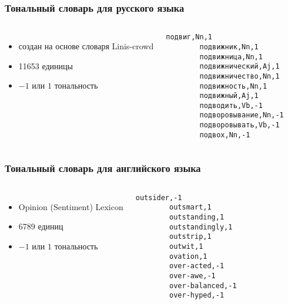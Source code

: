 \documentclass[xetex, aspectratio = 169]{beamer}
\begin{document}
\begin{frame}[fragile]
	\frametitle{Тональный словарь для русского языка}
	\begin{columns}
		\begin{itemize}
            \item создан на основе словаря Linis-crowd
            \item \num{11653} единицы
            \item \(-1\) или \(1\) тональность
        \end{itemize}
        \begin{Verbatim}[fontsize=\small]
        подвиг,Nn,1
        подвижник,Nn,1
        подвижница,Nn,1
        подвижнический,Aj,1
        подвижничество,Nn,1
        подвижность,Nn,1
        подвижный,Aj,1
        подводить,Vb,-1
        подворовывание,Nn,-1
        подворовывать,Vb,-1
        подвох,Nn,-1
        \end{Verbatim}
	\end{columns}
\end{frame}

\begin{frame}[fragile]
    \frametitle{Тональный словарь для английского языка}
    \begin{columns}
        \begin{itemize}
            \item Opinion (Sentiment) Lexicon
            \item \num{6789} единиц
            \item \(-1\) или \(1\) тональность
        \end{itemize}
        \begin{Verbatim}[fontsize=\small]
        outsider,-1
        outsmart,1
        outstanding,1
        outstandingly,1
        outstrip,1
        outwit,1
        ovation,1
        over-acted,-1
        over-awe,-1
        over-balanced,-1
        over-hyped,-1
        \end{Verbatim}
    \end{columns}
\end{frame}
\end{document}
